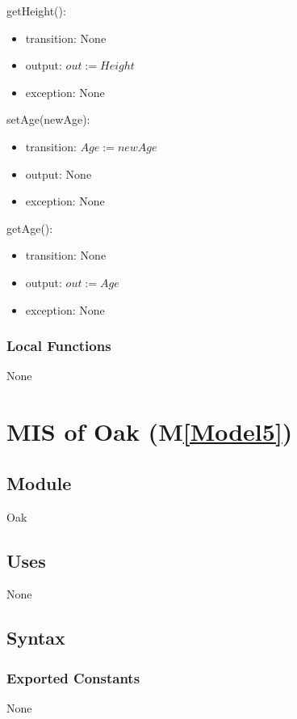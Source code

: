 \documentclass[12pt, titlepage]{article}
\newcommand{\mref}[1]{M\ref{#1}}
\begin{document}
\noindent getHeight():
\begin{itemize}
\item transition: None
\item output: $\mathit{out := Height}$
\item exception: None
\end{itemize}
\noindent setAge(newAge):
\begin{itemize}
\item transition: $\mathit{Age := newAge}$
\item output: None
\item exception: None
\end{itemize}
\noindent getAge():
\begin{itemize}
\item transition: None
\item output: $\mathit{out := Age}$
\item exception: None
\end{itemize}

\subsubsection{Local Functions}
None

\newpage

\renewcommand{\tn}{Oak }
\renewcommand{\tmn}{Oak}
\renewcommand{\constn}{Oak}

\section{MIS of \tn (\mref{Model5})}

\subsection{Module}
\tmn

\subsection{Uses}
None

\subsection{Syntax}
\subsubsection{Exported Constants}
None
\end{document}
